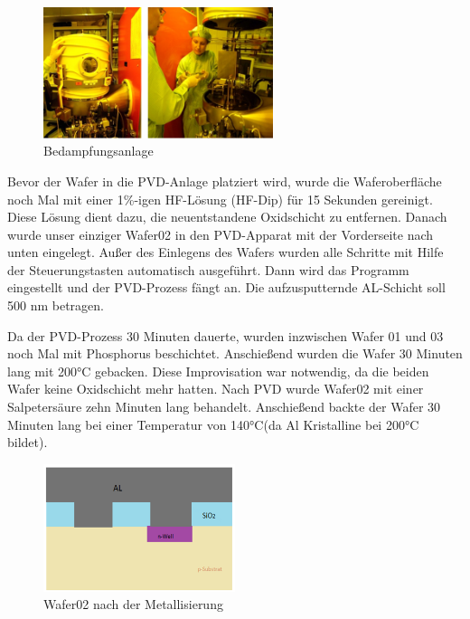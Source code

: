 \begin{figure}[H]
    \centering
        \includegraphics[width=0.6\textwidth]{bilder/Bedampfungsanlage.png}
    \caption{Bedampfungsanlage}
    \label{fig:Bedampfungsanlage}
\end{figure}


Bevor der Wafer in die PVD-Anlage platziert wird, wurde die Waferoberfläche noch Mal mit einer  1\%-igen HF-Lösung (HF-Dip) für 15 Sekunden gereinigt. Diese Lösung dient dazu, die neuentstandene Oxidschicht zu entfernen.
Danach wurde unser einziger Wafer02 in den PVD-Apparat mit der Vorderseite nach unten eingelegt. Außer des Einlegens des Wafers wurden alle Schritte mit Hilfe der Steuerungstasten automatisch ausgeführt.
Dann wird das Programm eingestellt und der PVD-Prozess fängt an. Die aufzusputternde AL-Schicht soll 500 nm betragen.

Da der PVD-Prozess 30 Minuten dauerte, wurden inzwischen Wafer 01 und 03 noch Mal mit Phosphorus beschichtet. Anschießend wurden die Wafer 30 Minuten lang mit 200°C gebacken. Diese Improvisation war notwendig, da die beiden Wafer keine Oxidschicht mehr hatten.
Nach PVD wurde Wafer02 mit einer Salpetersäure zehn Minuten lang behandelt.
Anschießend backte  der Wafer 30 Minuten lang bei einer Temperatur von 140°C(da Al Kristalline bei 200°C bildet).

\begin{figure}[H]
    \centering
        \includegraphics[width=0.5\textwidth]{bilder/Wafer02NachderMetallisierung.png}
    \caption{Wafer02 nach der Metallisierung}
    \label{fig:Wafer02NachderMetallisierung}
\end{figure}

